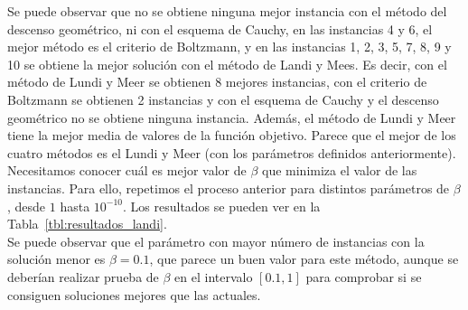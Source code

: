 \documentclass[12pt,a4paper,twoside,openright,titlepage,final]{article}
\begin{document}
Se puede observar que no se obtiene ninguna mejor instancia con el método del descenso geométrico, ni con el esquema de Cauchy, en las instancias 4 y 6, el mejor método es el criterio de Boltzmann, y en las instancias 1, 2, 3, 5, 7, 8, 9 y 10 se obtiene la mejor solución con el método de Landi y Mees. Es decir, con el método de Lundi y Meer se obtienen 8  mejores instancias, con el criterio de Boltzmann se obtienen 2 instancias y con el esquema de Cauchy y el descenso geométrico no se obtiene ninguna instancia. Además, el método de Lundi y Meer tiene la mejor media de valores de la función objetivo. Parece que el mejor de los cuatro métodos es el Lundi y Meer (con los parámetros definidos anteriormente).\\

Necesitamos conocer cuál es mejor valor de $\beta$ que minimiza el valor de las instancias. Para ello, repetimos el proceso anterior para distintos parámetros de $\beta$, desde $1$ hasta $10^{-10}$. Los resultados se pueden ver en la Tabla~\ref{tbl:resultados_landi}.\\

Se puede observar que el parámetro con mayor número de instancias con la solución menor es $\beta=0.1$, que parece un buen valor para este método, aunque se deberían realizar prueba de $\beta$ en el intervalo $[0.1, 1]$ para comprobar si se consiguen soluciones mejores que las actuales.\\
\end{document}
